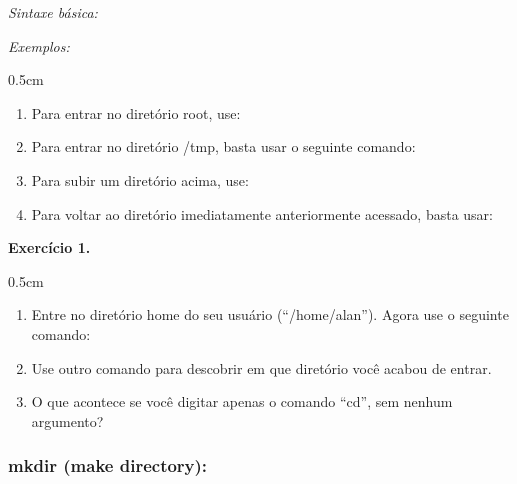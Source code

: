 \begin{refsection}
\textit{Sintaxe básica:}


\textit{Exemplos:}
\begin {myindentpar}{0.5cm}
\begin{enumerate}[\itshape i.]

\item{Para entrar no diretório root, use:}

\item{Para entrar no diretório /tmp, basta usar o seguinte comando:}

\item{Para subir um diretório acima, use:}

\item{Para voltar ao diretório imediatamente anteriormente acessado, basta usar:}


\end{enumerate}
\end{myindentpar}

\begin{blackBlock}{\textbf{Exercício 1.}}\label{tut1:ex:1.\arabic{ex}}

\begin {myindentpar}{0.5cm}
\begin{enumerate}[\itshape i.]

\item{Entre no diretório home do seu usuário (``/home/alan''). Agora use o seguinte comando:}


\item{Use outro comando para descobrir em que diretório você acabou de entrar.}\\
\item{O que acontece se você digitar apenas o comando ``cd'', sem nenhum argumento?}\\

\end{enumerate}
\end{myindentpar}

\end{blackBlock}

\subsubsection{mkdir (make directory):}\label{tut1:text_mode:commands:mkdir}



\end{refsection}
